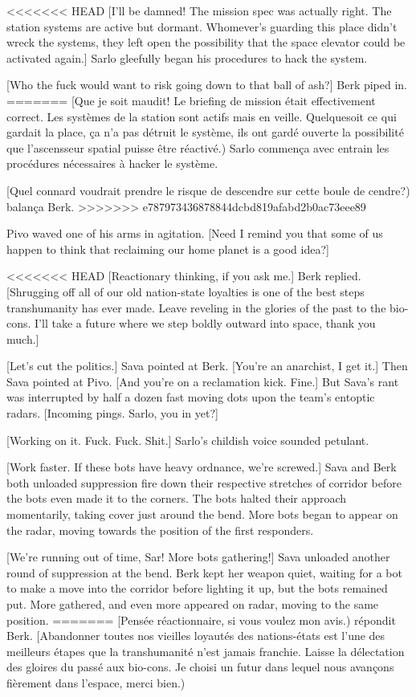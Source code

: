 <<<<<<< HEAD
[I'll be damned! The mission spec was actually right. The station systems are active but dormant. Whomever's guarding this place didn't wreck the systems, they left open the possibility that the space elevator could be activated again.] Sarlo gleefully began his procedures to hack the system. 

[Who the fuck would want to risk going down to that ball of ash?] Berk piped in. 
=======
[Que je soit maudit! Le briefing de mission était effectivement correct. Les systèmes de la station sont actifs mais en veille. Quelquesoit ce qui gardait la place, ça n'a pas détruit le système, ils ont gardé ouverte la possibilité que l'ascensseur spatial puisse être réactivé.) Sarlo commença avec entrain les procédures nécessaires à hacker le système. 

[Quel connard voudrait prendre le risque de descendre sur cette boule de cendre?) balança Berk. 
>>>>>>> e787973436878844dcbd819afabd2b0ac73eee89

Pivo waved one of his arms in agitation. [Need I remind you that some of us happen to think that reclaiming our home planet is a good idea?] 

<<<<<<< HEAD
[Reactionary thinking, if you ask me.] Berk replied. [Shrugging off all of our old nation-state loyalties is one of the best steps transhumanity has ever made. Leave reveling in the glories of the past to the bio-cons. I'll take a future where we step boldly outward into space, thank you much.] 

[Let's cut the politics.] Sava pointed at Berk. [You're an anarchist, I get it.] Then Sava pointed at Pivo. [And you're on a reclamation kick. Fine.] But Sava's rant was interrupted by half a dozen fast moving dots upon the team's entoptic radars. [Incoming pings. Sarlo, you in yet?] 

[Working on it. Fuck. Fuck. Shit.] Sarlo's childish voice sounded petulant. 

[Work faster. If these bots have heavy ordnance, we're screwed.] Sava and Berk both unloaded suppression fire down their respective stretches of corridor before the bots even made it to the corners. The bots halted their approach momentarily, taking cover just around the bend. More bots began to appear on the radar, moving towards the position of the first responders. 

[We're running out of time, Sar! More bots gathering!] Sava unloaded another round of suppression at the bend. Berk kept her weapon quiet, waiting for a bot to make a move into the corridor before lighting it up, but the bots remained put. More gathered, and even more appeared on radar, moving to the same position. 
=======
[Pensée réactionnaire, si vous voulez mon avis.) répondit Berk. [Abandonner toutes nos vieilles loyautés des nations-états est l'une des meilleurs étapes que la transhumanité n'est jamais franchie. Laisse la délectation des gloires du passé aux bio-cons. Je choisi un futur dans lequel nous avançons fièrement dans l'espace, merci bien.) 

